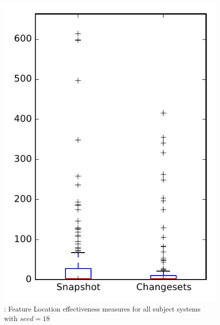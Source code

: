 
\begin{figure}
\centering
\includegraphics[height=0.4\textheight]{figures/flt_seed/rq1_overview_18}
\caption{\rone: Feature Location effectiveness measures for all subject systems with $seed=18$}
\label{fig:flt_seed:rq1:overview}
\end{figure}
